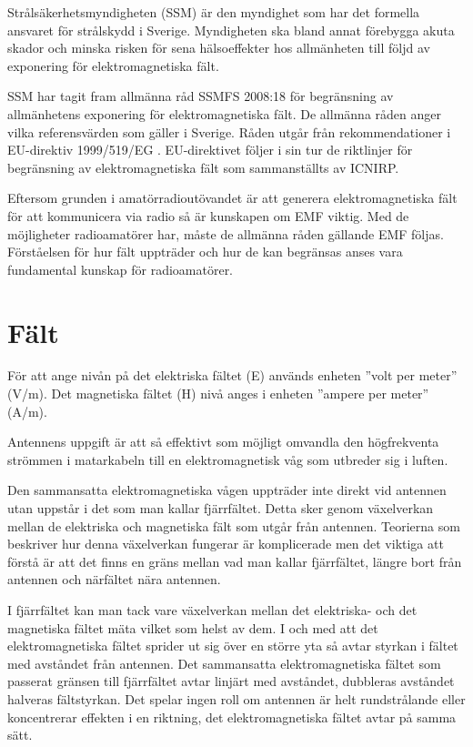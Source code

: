 Strålsäkerhetsmyndigheten (SSM) är den myndighet som har det formella ansvaret
för strålskydd i Sverige.
Myndigheten ska bland annat förebygga akuta skador och minska risken för sena
hälsoeffekter hos allmänheten till följd av exponering för elektromagnetiska
fält.

SSM har tagit fram allmänna råd SSMFS 2008:18 \cite{SSMFS2008:18} för
begränsning av allmänhetens exponering för elektromagnetiska fält.
De allmänna råden anger vilka referensvärden som gäller i Sverige.
Råden utgår från rekommendationer i EU-direktiv 1999/519/EG \cite{1999/519/EG}.
EU-direktivet följer i sin tur de riktlinjer för begränsning av
elektromagnetiska fält som sammanställts av ICNIRP.

Eftersom grunden i amatörradioutövandet är att generera elektromagnetiska fält
för att kommunicera via radio så är kunskapen om EMF viktig.
Med de möjligheter radioamatörer har, måste de allmänna råden gällande EMF
följas.
Förståelsen för hur fält uppträder och hur de kan begränsas anses vara
fundamental kunskap för radioamatörer.

\section{Fält}
För att ange nivån på det elektriska fältet (E) används enheten
''volt per meter'' (V/m).
Det magnetiska fältet (H) nivå anges i enheten ''ampere per meter'' (A/m).

Antennens uppgift är att så effektivt som möjligt omvandla den högfrekventa
strömmen i matarkabeln till en elektromagnetisk våg som utbreder sig i luften.

Den sammansatta elektromagnetiska vågen uppträder inte direkt vid antennen utan
uppstår i det som man kallar fjärrfältet.
Detta sker genom växelverkan mellan de elektriska och magnetiska fält som
utgår från antennen.
Teorierna som beskriver hur denna växelverkan fungerar är komplicerade
men det viktiga att förstå är att det finns en gräns mellan vad man
kallar fjärrfältet, längre bort från antennen och närfältet nära antennen.

I fjärrfältet kan man tack vare växelverkan mellan det elektriska- och det
magnetiska fältet mäta vilket som helst av dem.
I och med att det elektromagnetiska fältet sprider ut sig över en större yta så
avtar styrkan i fältet med avståndet från antennen.
Det sammansatta elektromagnetiska fältet som passerat gränsen till fjärrfältet
avtar linjärt med avståndet, dubbleras avståndet halveras fältstyrkan.
Det spelar ingen roll om antennen är helt rundstrålande eller koncentrerar
effekten i en riktning, det elektromagnetiska fältet avtar på samma sätt.

